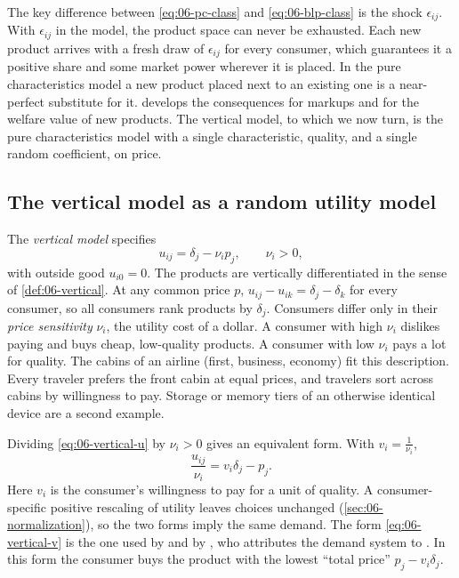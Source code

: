 The key difference between \eqref{eq:06-pc-class} and \eqref{eq:06-blp-class} is the shock
$\epsilon_{ij}$. With $\epsilon_{ij}$ in the model, the product space can never be exhausted. Each new
product arrives with a fresh draw of $\epsilon_{ij}$ for every consumer, which guarantees it a positive
share and some market power wherever it is placed. In the pure characteristics model a new product placed
next to an existing one is a near-perfect substitute for it.  develops the
consequences for markups and for the welfare value of new products. The vertical model, to which we now
turn, is the pure characteristics model with a single characteristic, quality, and a single random
coefficient, on price.

\subsection{The vertical model as a random utility model}\label{sec:06-vdef}

The \emph{vertical model} specifies
\begin{equation}\label{eq:06-vertical-u}
  u_{ij} = \delta_j - \nu_i p_j, \qquad \nu_i > 0,
\end{equation}
with outside good $u_{i0} = 0$. The products are vertically differentiated in the sense of
\cref{def:06-vertical}. At any common price $p$, $u_{ij} - u_{ik} = \delta_j - \delta_k$ for every consumer,
so all consumers rank products by $\delta_j$. Consumers differ only in their \emph{price sensitivity}
$\nu_i$, the utility cost of a dollar. A consumer with high $\nu_i$ dislikes paying and buys cheap,
low-quality products. A consumer with low $\nu_i$ pays a lot for quality. The cabins of an airline (first,
business, economy) fit this description. Every traveler prefers the front cabin at equal prices, and
travelers sort across cabins by willingness to pay. Storage or memory tiers of an otherwise identical device are a
second example.

Dividing \eqref{eq:06-vertical-u} by $\nu_i > 0$ gives an equivalent form. With $v_i = \frac{1}{\nu_i}$,
\begin{equation}\label{eq:06-vertical-v}
  \frac{u_{ij}}{\nu_i} = v_i\delta_j - p_j .
\end{equation}
Here $v_i$ is the consumer's willingness to pay for a unit of quality. A consumer-specific positive
rescaling of utility leaves choices unchanged (\cref{sec:06-normalization}), so the two forms imply the
same demand. The form \eqref{eq:06-vertical-v} is the one used by \citet{MussaRosen1978} and by
\citet{Bresnahan1987}, who attributes the demand system to \citet{PrescottVisscher1977}. In this form the
consumer buys the product with the lowest ``total price'' $p_j - v_i\delta_j$.

